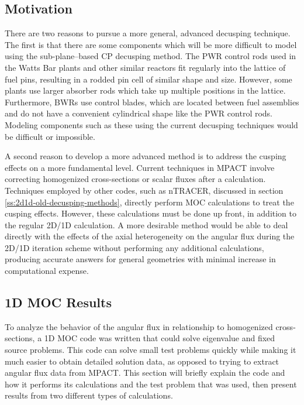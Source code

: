 \subsection{Motivation}

There are two reasons to pursue a more general, advanced decusping technique.  The first is that there are some components which will be more difficult to model using the sub-plane--based CP decusping method.  The PWR control rods used in the Watts Bar plants and other similar reactors fit regularly into the lattice of fuel pins, resulting in a rodded pin cell of similar shape and size.  However, some plants use larger absorber rods which take up multiple positions in the lattice.  Furthermore, BWRs use control blades, which are located between fuel assemblies and do not have a convenient cylindrical shape like the PWR control rods.  Modeling components such as these using the current decusping techniques would be difficult or impossible.

A second reason to develop a more advanced method is to address the cusping effects on a more fundamental level.  Current techniques in MPACT involve correcting homogenized cross-sections or scalar fluxes after a calculation.  Techniques employed by other codes, such as nTRACER, discussed in section \ref{ss:2d1d-old-decusping-methods}, directly perform MOC calculations to treat the cusping effects.  However, these calculations must be done up front, in addition to the regular 2D/1D calculation.  A more desirable method would be able to deal directly with the effects of the axial heterogeneity on the angular flux during the 2D/1D iteration scheme without performing any additional calculations, producing accurate answers for general geometries with minimal increase in computational expense.

\subsection{1D MOC Results}

To analyze the behavior of the angular flux in relationship to homogenized cross-sections, a 1D MOC code was written that could solve eigenvalue and fixed source problems.  This code can solve small test problems quickly while making it much easier to obtain detailed solution data, as opposed to trying to extract angular flux data from MPACT.  This section will briefly explain the code and how it performs its calculations and the test problem that was used, then present results from two different types of calculations.

